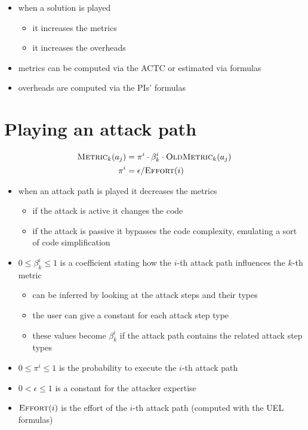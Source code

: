 \documentclass[9pt]{scrartcl}
\newcommand{\AttackCoefficient}[2]{\beta_{#1}^{#2}}
\newcommand{\Probability}[1]{\pi^{#1}}
\newcommand{\Expertise}{\epsilon}
\newcommand{\Effort}[1]{\textsc{Effort}(#1)}
\newcommand{\Metric}[2]{\textsc{Metric}_{#1}(#2)}
\newcommand{\OldMetric}[2]{\textsc{OldMetric}_{#1}(#2)}
\begin{document}
\begin{itemize}
	\item when a solution is played
		\begin{itemize}
			\item it increases the metrics
			\item it increases  the overheads
		\end{itemize}
	\item metrics can be computed via the ACTC or estimated via formulas
	\item overheads are computed via the PIs' formulas
\end{itemize}

\section*{Playing an attack path}

\begin{align*}
	\Metric{k}{a_j} & = \Probability{i} \cdot \AttackCoefficient{k}{i} \cdot \OldMetric{k}{a_j}\\
	\Probability{i} & = \Expertise / \Effort{i}
\end{align*}

\begin{itemize}
	\item when an attack path is played it decreases the metrics
	\begin{itemize}
		\item if the attack is active it changes the code
		\item if the attack is passive it bypasses the code complexity, emulating a sort of code simplification
	\end{itemize}
	\item $0 \le \AttackCoefficient{k}{i} \le 1$ is a coefficient stating how the $i$-th attack path influences the $k$-th metric
	\begin{itemize}
		\item can be inferred by looking at the attack steps and their types
		\item the user can give a constant for each attack step type
		\item these values become $\AttackCoefficient{k}{i}$ if the attack path contains the related attack step types
	\end{itemize}
	\item $0 \le \Probability{i} \le 1$ is the probability to execute the $i$-th attack path
	\item $0 < \epsilon \le 1$ is a constant for the attacker expertise
	\item $\Effort{i}$ is the effort of the $i$-th attack path (computed with the UEL formulas)
\end{itemize}
\end{document}
